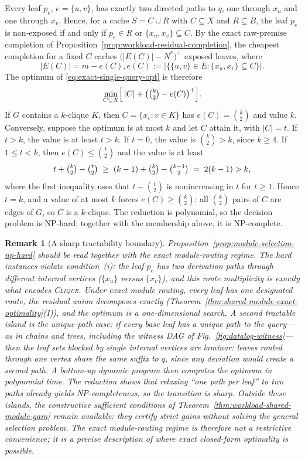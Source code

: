 \documentclass[journal]{IEEEtran}
\makeatletter
\newtheorem{remark}{Remark}[section]
\numberwithin{equation}{section}
\renewenvironment{proof}[1][\proofname]{\par
  \pushQED{\qed}%
  \normalfont \topsep6\p@\@plus6\p@\relax
  \trivlist
  \item[\hskip\labelsep
        \itshape
    #1\@addpunct{.}]\ignorespaces
}{%
  \popQED\endtrivlist\@endpefalse
}
\makeatother
\begin{document}
\begin{proof}
Every leaf \(p_e\), \(e=\{u,v\}\), has exactly two directed paths to \(q\),
one through \(x_u\) and one through \(x_v\).  Hence, for a cache
\(S=C\cup R\) with \(C\subseteq X\) and \(R\subseteq B\), the leaf \(p_e\) is
non-exposed if and only if \(p_e\in R\) or \(\{x_u,x_v\}\subseteq C\).  By
the exact raw-premise completion of
Proposition~\ref{prop:workload-residual-completion}, the cheapest completion
for a fixed \(C\) caches \(\bigl(|E(C)|-N^{*}\bigr)^{+}\) exposed leaves,
where
\[
  |E(C)|=m-e(C),
  e(C):=\bigl|\bigl\{\{u,v\}\in E:\{x_u,x_v\}\subseteq C\bigr\}\bigr|.
\]
The optimum of \eqref{eq:exact-single-query-opt} is therefore
\[
  \min_{C\subseteq X}
  \Bigl[\,|C|+\bigl(\tbinom{k}{2}-e(C)\bigr)^{+}\Bigr].
\]
If \(G\) contains a \(k\)-clique \(K\), then \(C=\{x_v:v\in K\}\) has
\(e(C)=\binom{k}{2}\) and value \(k\).  Conversely, suppose the optimum is at
most \(k\) and let \(C\) attain it, with \(|C|=t\).  If \(t>k\), the value is
at least \(t>k\).  If \(t=0\), the value is \(\binom{k}{2}>k\), since
\(k\ge4\).  If \(1\le t<k\), then \(e(C)\le\binom{t}{2}\) and the value is
at least
\[
  t+\tbinom{k}{2}-\tbinom{t}{2}
  \;\ge\;
  (k-1)+\tbinom{k}{2}-\tbinom{k-1}{2}
  \;=\;
  2(k-1)>k,
\]
where the first inequality uses that \(t-\binom{t}{2}\) is nonincreasing in
\(t\) for \(t\ge1\).  Hence \(t=k\), and a value of at most \(k\) forces
\(e(C)\ge\binom{k}{2}\): all \(\binom{k}{2}\) pairs of \(C\) are edges of
\(G\), so \(C\) is a \(k\)-clique.  The reduction is polynomial, so the
decision problem is NP-hard; together with the membership above, it is
NP-complete.
\end{proof}

\begin{remark}[A sharp tractability boundary]
\label{rem:tractability-boundary}
Proposition~\ref{prop:module-selection-np-hard} should be read together with
the exact module-routing regime.  The hard instances violate condition~(i):
the leaf \(p_e\) has two derivation paths through different internal vertices
(\(\{x_u\}\) versus \(\{x_v\}\)), and this route multiplicity is exactly what
encodes \textsc{Clique}.  Under exact module routing, every leaf has one
designated route, the residual union decomposes exactly
(Theorem~\ref{thm:shared-module-exact-optimality}(I)), and the optimum is a
one-dimensional search.  A second tractable island is the unique-path case:
if every base leaf has a unique path to the query---as in chains and trees,
including the witness DAG of Fig.~\ref{fig:datalog-witness}---then the leaf
sets blocked by single internal vertices are laminar: leaves routed through
one vertex share the same suffix to \(q\), since any deviation would create a
second path.  A bottom-up dynamic program then computes the optimum in
polynomial time.  The reduction shows that relaxing ``one path per leaf'' to
\emph{two} paths already yields NP-completeness, so the transition is sharp.
Outside these islands, the constructive sufficient conditions of
Theorem~\ref{thm:workload-shared-module-gain} remain available: they certify
strict gains without solving the general selection problem.  The exact
module-routing regime is therefore not a restrictive convenience; it is a
precise description of where exact closed-form optimality is possible.
\end{remark}
\end{document}
